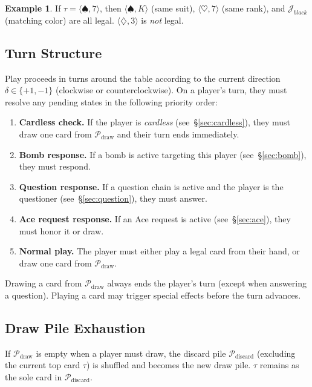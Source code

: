 \documentclass[11pt,a4paper,twoside]{article}
\theoremstyle{definition}
\newtheorem{example}{Example}[section]
\theoremstyle{remark}
\newcommand{\Card}[2]{\ensuremath{\langle #1, #2 \rangle}}
\newcommand{\Joker}[1]{\ensuremath{\mathcal{J}_{#1}}}
\newcommand{\Pile}{\ensuremath{\mathcal{P}}}
\newcommand{\Top}{\ensuremath{\tau}}
\newcommand{\Dir}{\ensuremath{\delta}}
\begin{document}
\begin{example}
  If $\Top = \Card{\spadesuit}{7}$, then $\Card{\spadesuit}{K}$ (same suit),
  $\Card{\heartsuit}{7}$ (same rank), and $\Joker{black}$ (matching color) are
  all legal. $\Card{\diamondsuit}{3}$ is \emph{not} legal.
\end{example}

\subsection{Turn Structure}

Play proceeds in turns around the table according to the current direction
$\Dir \in \{+1, -1\}$ (clockwise or counterclockwise). On a player's turn,
they must resolve any pending states in the following priority order:

\begin{enumerate}[label=\textbf{T\arabic*.}, leftmargin=*]
  \item \textbf{Cardless check.} If the player is \emph{cardless}
  (see~\S\ref{sec:cardless}), they must draw one card from $\Pile_{\text{draw}}$
  and their turn ends immediately.
  \item \textbf{Bomb response.} If a bomb is active targeting this player
  (see~\S\ref{sec:bomb}), they must respond.
  \item \textbf{Question response.} If a question chain is active and the
  player is the questioner (see~\S\ref{sec:question}), they must answer.
  \item \textbf{Ace request response.} If an Ace request is active
  (see~\S\ref{sec:ace}), they must honor it or draw.
  \item \textbf{Normal play.} The player must either play a legal card from
  their hand, or draw one card from $\Pile_{\text{draw}}$.
\end{enumerate}

Drawing a card from $\Pile_{\text{draw}}$ always ends the player's turn
(except when answering a question). Playing a card may trigger special effects
before the turn advances.

\subsection{Draw Pile Exhaustion}

If $\Pile_{\text{draw}}$ is empty when a player must draw, the discard pile
$\Pile_{\text{discard}}$ (excluding the current top card $\Top$) is shuffled
and becomes the new draw pile. $\Top$ remains as the sole card in
$\Pile_{\text{discard}}$.
\end{document}
